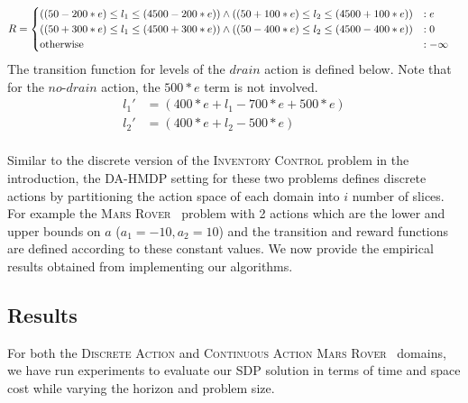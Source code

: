 \documentclass[twoside,11pt]{article}
\newcommand{\MarsRover}{\textsc{Mars Rover }}
\newcommand{\InventoryControl}{\textsc{Inventory Control }}
\begin{document}
\vspace{-4mm}
{\footnotesize
\begin{align*}
R & = \begin{cases}
((50-200*e) \leq l_1 \leq (4500-200*e)) \wedge ((50+100*e) \leq l_2 \leq (4500+100*e)) %
&:e\\
((50+300*e) \leq l_1 \leq (4500+300*e)) \wedge ((50-400*e) \leq l_2 \leq (4500-400*e)) %
&:0\\
\text{\normalsize otherwise} &: -\infty \\
\end{cases}
\end{align*}}
The transition function for levels of the $\mathit{drain}$ action is defined below. Note that for the $\mathit{no}$-$\mathit{drain}$ action, the $\mathit{500 * e}$ term is not involved.
{%
\begin{align*}
l_1' & =(400 * e + l_1 -700 * e + 500 * e) \\
l_2'& =(400 * e + l_2 - 500 * e) \\
\end{align*}}

Similar to the discrete version of the \InventoryControl problem in the introduction, the DA-HMDP setting for these two problems defines discrete actions by partitioning the action space of each domain into $i$ number of slices. For example the \MarsRover\ problem with 2 actions which are the lower and upper bounds on $a$ ($a_1=-10, a_2 = 10$) and the transition and reward functions are defined according to these constant values.
We now provide the empirical results obtained from implementing our algorithms.

\subsection{Results}

For both the \textsc{Discrete Action} and \textsc{Continuous Action} \MarsRover\ domains, 
we have run experiments to evaluate our SDP solution 
in terms of time and space cost while varying the horizon and problem size.
\end{document}
